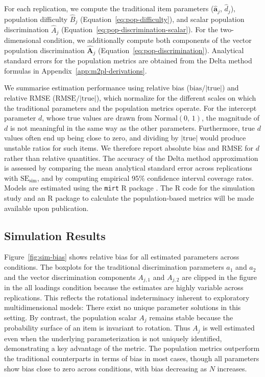 \documentclass[man, 12pt, floatsintext]{apa7}
\begin{document}
For each replication, we compute the traditional item parameters ($\hat{\mathbf{a}}_j$, $\hat{d}_j$), population difficulty $\hat{B}_j$ (Equation~\ref{eq:pop-difficulty}), and scalar population discrimination $\hat{A}_j$ (Equation~\ref{eq:pop-discrimination-scalar}). For the two-dimensional condition, we additionally compute both components of the vector population discrimination $\hat{\mathbf{A}}_j$ (Equation~\ref{eq:pop-discrimination}). Analytical standard errors for the population metrics are obtained from the Delta method formulas in Appendix~\ref{app:m2pl-derivations}.

We summarise estimation performance using relative bias ($\mathrm{bias}/|\mathrm{true}|$) and relative RMSE ($\mathrm{RMSE}/|\mathrm{true}|$), which normalize for the different scales on which the traditional parameters and the population metrics operate. For the intercept parameter $d$, whose true values are drawn from $\mathrm{Normal}(0,\, 1)$, the magnitude of $d$ is not meaningful in the same way as the other parameters. Furthermore, true $d$ values often end up being close to zero, and dividing by $|\mathrm{true}|$ would produce unstable ratios for such items. We therefore report absolute bias and RMSE for $d$ rather than relative quantities. The accuracy of the Delta method approximation is assessed by comparing the mean analytical standard error across replications with $\mathrm{SE}_{\mathrm{sim}}$, and by computing empirical 95\% confidence interval coverage rates. Models are estimated using the \texttt{mirt} R package \parencite{Chalmers2012}. The R code for the simulation study and an R package to calculate the population-based metrics will be made available upon publication.

\subsection{Simulation Results}

Figure~\ref{fig:sim-bias} shows relative bias for all estimated parameters across conditions. The boxplots for the traditional discrimination parameters $a_1$ and $a_2$ and the vector discrimination components $A_{j,1}$ and $A_{j,2}$ are clipped in the figure in the all loadings condition because the estimates are highly variable across replications. This reflects the rotational indeterminacy inherent to exploratory multidimensional models: There exist no unique parameter solutions in this setting. By contrast, the population scalar $A_j$ remains stable because the probability surface of an item is invariant to rotation. Thus $A_j$ is well estimated even when the underlying parameterization is not uniquely identified, demonstrating a key advantage of the metric. The population metrics outperform the traditional counterparts in terms of bias in most cases, though all parameters show bias close to zero across conditions, with bias decreasing as $N$ increases. 
\end{document}
